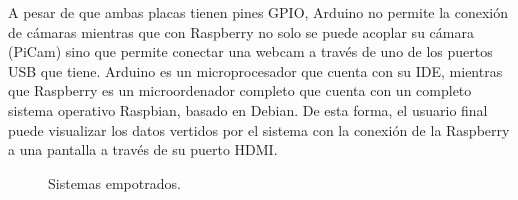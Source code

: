 A pesar de que ambas placas tienen pines GPIO, Arduino no permite la conexión de cámaras mientras que con Raspberry no solo se puede acoplar su cámara (PiCam) sino que permite conectar una webcam a través de uno de los puertos USB que tiene. Arduino es un microprocesador que cuenta con su IDE, mientras que Raspberry es un microordenador completo que cuenta con un completo sistema operativo Raspbian, basado en Debian. De esta forma, el usuario final puede visualizar los datos vertidos por el sistema con la conexión de la Raspberry a una pantalla a través de su puerto HDMI.\\
\begin{figure}[h!]
  \begin{center}
    \hspace{2mm}
  \end{center}
\caption{Sistemas empotrados.} \label{fig:placas}
\end{figure}

